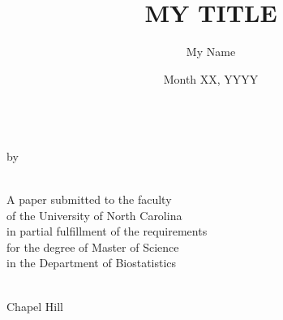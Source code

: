\documentclass{biosmasters}
\author{My Name}
\title{MY TITLE}
\date{Month XX, YYYY}
\makeatletter
\let\thetitle\@title
\let\theauthor\@author
\let\thedate\@date
\makeatother
\begin{document}
%

\begin{titlepage}


\begin{center} %


\thetitle \\[1cm] %


by\\[1cm]

\theauthor \\[1cm]

\begin{minipage}{0.8\textwidth}
\begin{center}
A paper submitted to the faculty \\
of the University of North Carolina \\
in partial fulfillment of the requirements \\
for the degree of Master of Science \\
in the Department of Biostatistics
\end{center}
\end{minipage}\\[1cm]

Chapel Hill \\[1cm]


\thedate\\[3cm] %


\end{center}
\end{titlepage}
\end{document}
